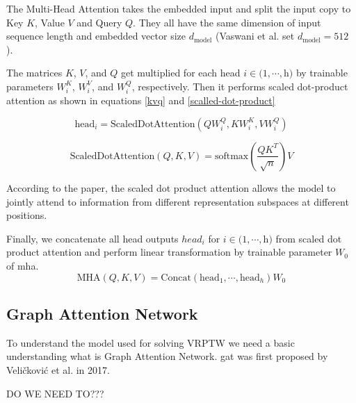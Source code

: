             The Multi-Head Attention takes the embedded input and split the input copy to Key $K$, Value $V$ and Query $Q$. They all have the same dimension of input sequence length and embedded vector size $d_{\text{model}}$ (Vaswani et al. set $d_{\text{model}}=512$ \cite{attention-is-all}).
            
            The matrices $K$, $V$, and $Q$ get multiplied for each head $i \in (1, \cdots, $h$)$ by trainable parameters $W_i^K$, $W_i^V$, and $W_i^Q$, respectively. Then it performs scaled dot-product attention as shown in equations \ref{kvq} and \ref{scalled-dot-product}
            
            \begin{equation}\label{kvq}
                \text{head}_i = \text{ScaledDotAttention}(Q W_i^Q, K W_i^K, V W_i^Q)
            \end{equation}
            
            \begin{equation}\label{scalled-dot-product}
                \text{ScaledDotAttention}(Q, K, V) = \text{softmax}(\dfrac{Q K^T}{\sqrt{n}}) V
            \end{equation}
            
            According to the paper\cite{attention-is-all}, the scaled dot product attention allows the model to jointly attend to information from different representation subspaces at different positions.
            
            Finally, we concatenate all head outputs $head_i$ for $i \in (1, \cdots, $h$)$ from scaled dot product attention and perform linear transformation by trainable parameter $W_0$ of \gls{mha}.
            \begin{equation}
                \text{MHA}(Q, K, V) = \text{Concat}(\text{head}_1, \cdots, \text{head}_h)W_0
            \end{equation}
            
        \subsection{Graph Attention Network}\label{graph-attention-network}
        To understand the model used for solving \gls{VRPTW} we need a basic understanding what is Graph Attention Network.
        \gls{gat} was first proposed by Veličković et al. \cite{gat} in 2017.
        
        DO WE NEED TO???
    
    

